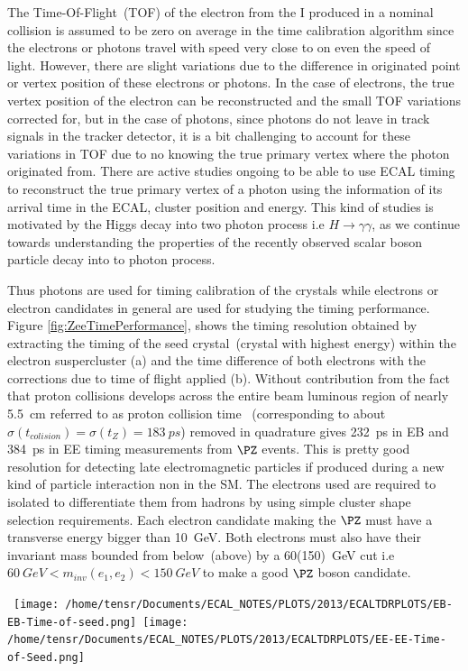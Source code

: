The Time-Of-Flight~(TOF) of the electron from the I produced in a nominal collision is assumed to be zero on average in the time calibration algorithm since the electrons or photons travel with speed very close to on even the speed of light. However, there are slight variations due to the difference in originated point or vertex position of these electrons or photons. In the case of electrons, the true vertex position of the electron can be reconstructed and the small TOF variations corrected for, but in the case of photons, since photons do not leave in track signals in the tracker detector, it is a bit challenging to account for these variations in TOF due to no knowing the true primary vertex where the photon originated from. There are active studies ongoing to be able to use ECAL timing to reconstruct the true primary vertex of a photon using the information of its arrival time in the ECAL, cluster position and energy. This kind of studies is motivated by the Higgs decay into two photon process  i.e $H \rightarrow \gamma \gamma $, as we continue towards understanding the properties of the recently observed scalar boson particle decay into to photon process.  

Thus photons are used for timing calibration of the \pb crystals while electrons or electron candidates in general are used for studying the timing performance.
Figure \ref{fig:ZeeTimePerformance}, shows the timing resolution obtained  by extracting the timing of the seed crystal~(crystal with highest energy) within the electron suspercluster (a) and the time difference of both electrons with the corrections due to time of flight applied (b). Without contribution from the fact that proton collisions develops across the entire beam luminous region of nearly 5.5~cm referred to as proton collision time ~(corresponding to about $\sigma(t_{colision}) = \sigma(t_{Z}) = 183~ps$) removed in quadrature gives 232~ps in EB and 384~ps in EE timing measurements from $\PZ$ events. This is pretty good resolution for detecting late electromagnetic particles if produced during a new kind of particle interaction non in the SM.
The electrons used are required to isolated to differentiate them from hadrons by using simple cluster shape  selection requirements. Each electron candidate making the $\PZ$ must have  a transverse energy bigger than 10~GeV. Both electrons must also have their invariant mass bounded from below~(above) by a 60(150)~GeV cut i.e $ 60~GeV < m_{inv}(e_{1},e_{2}) < 150~ GeV$ to make a good $\PZ$ boson candidate. 

\begin{center}
\centering
\mbox{
\texttt{[image: /home/tensr/Documents/ECAL\_NOTES/PLOTS/2013/ECALTDRPLOTS/EB-EB-Time-of-seed.png]}\quad
\texttt{[image: /home/tensr/Documents/ECAL\_NOTES/PLOTS/2013/ECALTDRPLOTS/EE-EE-Time-of-Seed.png]}}
\label{fig:ZeeTimePerformance}
\end{center}

